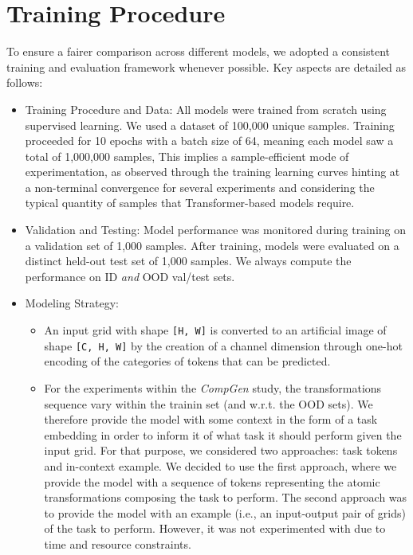 \section{Training Procedure} \label{appendix:training_procedure}
To ensure a fairer comparison across different models, we adopted a consistent training and evaluation framework whenever possible. Key aspects are detailed as follows:
\begin{itemize}
    \item Training Procedure and Data: All models were trained from scratch using supervised learning. We used a dataset of 100,000 unique samples. Training proceeded for 10 epochs with a batch size of 64, meaning each model saw a total of 1,000,000 samples, This implies a sample-efficient mode of experimentation, as observed through the training learning curves hinting at a non-terminal convergence for several experiments and considering the typical quantity of samples that Transformer-based models require.

    \vspace{1em}
    \item Validation and Testing: Model performance was monitored during training on a validation set of 1,000 samples. After training, models were evaluated on a distinct held-out test set of 1,000 samples. We always compute the performance on ID \textit{and} OOD val/test sets.

    \vspace{1em}
    \item Modeling Strategy:
    \begin{itemize}
        \item An input grid with shape \texttt{[H, W]} is converted to an artificial image of shape \texttt{[C, H, W]} by the creation of a channel dimension through one-hot encoding of the categories of tokens that can be predicted.
        \vspace{1em}

        \item For the experiments within the \textit{CompGen} study, the transformations sequence vary within the trainin set (and w.r.t. the OOD sets). We therefore provide the model with some context in the form of a task embedding in order to inform it of what task it should perform given the input grid. For that purpose, we considered two approaches: task tokens and in-context example. We decided to use the first approach, where we provide the model with a sequence of tokens representing the atomic transformations composing the task to perform. The second approach was to provide the model with an example (i.e., an input-output pair of grids) of the task to perform. However, it was not experimented with due to time and resource constraints.
    \end{itemize}
    


\end{itemize}
